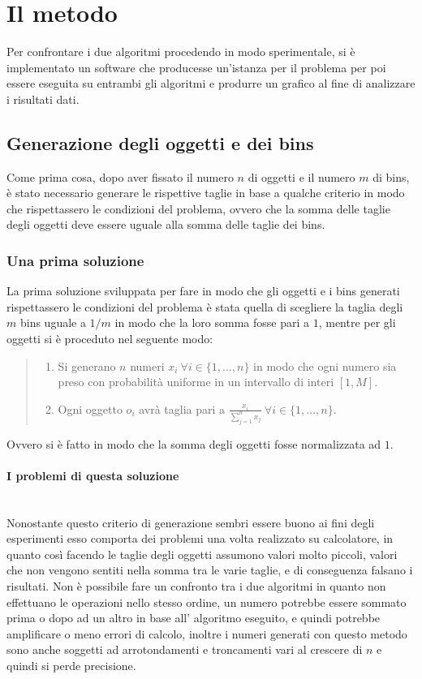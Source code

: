 \section{Il metodo}
Per confrontare i due algoritmi procedendo in modo sperimentale, si è implementato un software che producesse
un'istanza per il problema per poi essere eseguita su entrambi gli algoritmi e produrre un grafico al fine di 
analizzare i risultati dati. 

\subsection{Generazione degli oggetti e dei bins}
Come prima cosa, dopo aver fissato il numero $ n $ di oggetti e il numero $ m $ di bins, è stato necessario generare le rispettive taglie
in base a qualche criterio in modo che rispettassero le condizioni del problema, ovvero che la somma delle taglie degli oggetti 
deve essere uguale alla somma delle taglie dei bins.

\subsubsection{Una prima soluzione}
La prima soluzione sviluppata per fare in modo che gli oggetti e i bins generati rispettassero le condizioni del problema
è stata quella di scegliere la taglia degli $ m $ bins uguale a $ 1/m $ in modo che la loro somma fosse pari a $ 1 $, mentre
per gli oggetti si è proceduto nel seguente modo:
\begin{quote}
	\begin{enumerate}
		\item Si generano $ n $ numeri $ x_i \: \forall i \in \{1, ..., n\} $ in modo che ogni numero sia preso con probabilità 
			  uniforme in un intervallo di interi $ [1, M] $.
		\item Ogni oggetto $ o_i $ avrà taglia pari a $ \displaystyle\frac{x_i}{\sum_{j=1}^n x_j} \: \forall i \in \{1, ..., n\} $.
	\end{enumerate}
\end{quote}
Ovvero si è fatto in modo che la somma degli oggetti fosse normalizzata ad $ 1 $.

\paragraph{I problemi di questa soluzione}\mbox{}\\
Nonostante questo criterio di generazione sembri essere buono ai fini degli esperimenti esso comporta dei problemi una volta
realizzato su calcolatore, in quanto così facendo le taglie degli oggetti assumono valori molto piccoli, valori che non vengono
sentiti nella somma tra le varie taglie, e di conseguenza falsano i risultati. Non è possibile fare un confronto tra i due algoritmi
in quanto non effettuano le operazioni nello stesso ordine, un numero potrebbe essere sommato prima o dopo ad un altro in base all'
algoritmo eseguito, e quindi potrebbe amplificare o meno errori di calcolo, inoltre i numeri generati con questo metodo sono
anche soggetti ad arrotondamenti e troncamenti vari al crescere di $ n $ e quindi si perde precisione.


